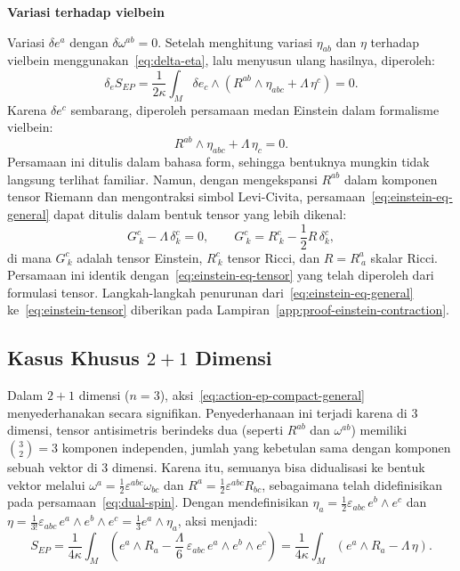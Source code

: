 \vspace{0.5em}
\noindent \textbf{Variasi terhadap vielbein}

Variasi $\delta e^a$ dengan $\delta\omega^{ab} = 0$. Setelah menghitung variasi $\eta_{ab}$ dan $\eta$ terhadap vielbein menggunakan~\eqref{eq:delta-eta}, lalu menyusun ulang hasilnya, diperoleh:
\begin{equation}
    \delta_e S_{EP} = \frac{1}{2\kappa}\int_M \delta e_c \wedge \left(R^{ab} \wedge \eta_{abc} + \Lambda\, \eta^c\right) = 0.
\end{equation}
Karena $\delta e^c$ sembarang, diperoleh persamaan medan Einstein dalam formalisme vielbein:
\begin{equation}\label{eq:einstein-eq-general}
    R^{ab} \wedge \eta_{abc} + \Lambda\, \eta_c = 0.
\end{equation}
Persamaan ini ditulis dalam bahasa form, sehingga bentuknya mungkin tidak langsung terlihat familiar. Namun, dengan mengekspansi $R^{ab}$ dalam komponen tensor Riemann dan mengontraksi simbol Levi-Civita, persamaan~\eqref{eq:einstein-eq-general} dapat ditulis dalam bentuk tensor yang lebih dikenal:
\begin{equation}\label{eq:einstein-tensor}
    G^c_{\ k} - \Lambda\, \delta^c_k = 0, \qquad G^c_{\ k} = R^c_{\ k} - \frac{1}{2}R\,\delta^c_k,
\end{equation}
di mana $G^c_{\ k}$ adalah tensor Einstein, $R^c_{\ k}$ tensor Ricci, dan $R = R^a_{\ a}$ skalar Ricci. Persamaan ini identik dengan~\eqref{eq:einstein-eq-tensor} yang telah diperoleh dari formulasi tensor. Langkah-langkah penurunan dari~\eqref{eq:einstein-eq-general} ke~\eqref{eq:einstein-tensor} diberikan pada Lampiran~\ref{app:proof-einstein-contraction}.

\subsection{Kasus Khusus $2+1$ Dimensi}
\label{subsec:ep-3d}

Dalam $2+1$ dimensi ($n = 3$), aksi~\eqref{eq:action-ep-compact-general} menyederhanakan secara signifikan. Penyederhanaan ini terjadi karena di 3 dimensi, tensor antisimetris berindeks dua (seperti $R^{ab}$ dan $\omega^{ab}$) memiliki $\binom{3}{2} = 3$ komponen independen, jumlah yang kebetulan sama dengan komponen sebuah vektor di 3 dimensi. Karena itu, semuanya bisa didualisasi ke bentuk vektor melalui $\omega^a = \frac{1}{2}\varepsilon^{abc}\omega_{bc}$ dan $R^a = \frac{1}{2}\varepsilon^{abc}R_{bc}$, sebagaimana telah didefinisikan pada persamaan~\eqref{eq:dual-spin}. Dengan mendefinisikan $\eta_a = \frac{1}{2}\varepsilon_{abc}\, e^b \wedge e^c$ dan $\eta = \frac{1}{3!}\varepsilon_{abc}\, e^a \wedge e^b \wedge e^c = \frac{1}{3}e^a \wedge \eta_a$, aksi menjadi:
\begin{equation}\label{eq:action-ep}
    S_{EP} = \frac{1}{4\kappa}\int_M \left(e^a \wedge R_a - \frac{\Lambda}{6}\, \varepsilon_{abc}\, e^a \wedge e^b \wedge e^c\right) = \frac{1}{4\kappa}\int_M \left(e^a \wedge R_a - \Lambda\, \eta\right).
\end{equation}

